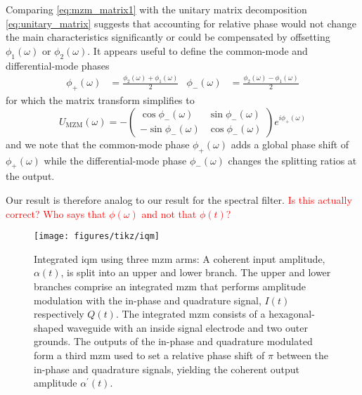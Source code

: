 Comparing \cref{eq:mzm_matrix1} with the unitary matrix decomposition \cref{eq:unitary_matrix} suggests that accounting for relative phase would not change the main characteristics significantly or could be compensated by offsetting $\phi_1(\omega)$ or $\phi_2(\omega)$.
It appears useful to define the common-mode and differential-mode phases
\begin{align}
	\phi_+(\omega)
	&=
	\frac{\phi_2(\omega)+\phi_1(\omega)}{2}
	&
	\phi_-(\omega)
	&=
	\frac{\phi_2(\omega)-\phi_1(\omega)}{2}
\end{align}
for which the matrix transform simplifies to
\begin{equation}
	U_\text{MZM}(\omega)
	=
	-
	\begin{pmatrix}
		\cos\phi_-(\omega) & \sin\phi_-(\omega) \\
		-\sin\phi_-(\omega) & \cos\phi_-(\omega)
	\end{pmatrix}
	e^{i\phi_+(\omega)}
	\label{eq:mzm_matrix2}
\end{equation}
and we note that the common-mode phase $\phi_+(\omega)$ adds a global phase shift of $\phi_+(\omega)$ while the differential-mode phase $\phi_-(\omega)$ changes the splitting ratios at the output.

Our result is therefore analog to our result for the spectral filter.
\textcolor{red}{Is this actually correct? Who says that $\phi(\omega)$ and not that $\phi(t)$?}

\begin{figure}[htb]
    \centering
    \texttt{[image: figures/tikz/iqm]}
    \caption{Integrated \gls{iqm} using three \gls{mzm} arms: A coherent input amplitude, $\alpha(t)$, is split into an upper and lower branch. The upper and lower branches comprise an integrated \gls{mzm} that performs amplitude modulation with the in-phase and quadrature signal, $I(t)$ respectively $Q(t)$. The integrated \gls{mzm} consists of a hexagonal-shaped waveguide with an inside signal electrode and two outer grounds. The outputs of the in-phase and quadrature modulated form a third \gls{mzm} used to set a relative phase shift of $\pi$ between the in-phase and quadrature signals, yielding the coherent output amplitude $\alpha^\prime(t)$.}\label{fig:iqm}
\end{figure}